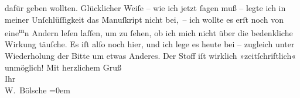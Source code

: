 \begin{ledgroupsized}[t]{13cm}
               dafür geben wollten. Glücklicher Weiſe – wie ich jetzt ſagen muß – legte ich in {\pb}meiner Unſchlüſſigkeit das Manuſkript nicht bei, – ich
               wollte es erſt noch von eine\substVorne{}\textsuperscript{m}\substDazwischen{}n\substHinten{} Andern leſen laſſen, um  zu ſehen, ob ich
               mich nicht über die bedenkliche Wirkung täuſche. Es iſt alſo noch hier, und ich lege
               es heute bei – zugleich unter Wiederholung der Bitte um etwas Anderes. Der Stoff iſt wirklich
               »zeitſchriftlich« unmöglich!\pend
           \pstart
           Mit herzlichem Gruß{\\[\baselineskip]}Ihr{\\[\baselineskip]}\spacefill\mbox{W. Bölsche}\pend
           \leftskip=0em{}
         
         \endnumbering{}\end{ledgroupsized}  \newcommand{\dateiname}{L00106}\newcommand{\titel}{Wilhelm Bölsche an Arthur Schnitzler, [24. 7. 1892]}\newcommand{\editorInnen}{Martin Anton Müller und Gerd-Hermann Susen}
      